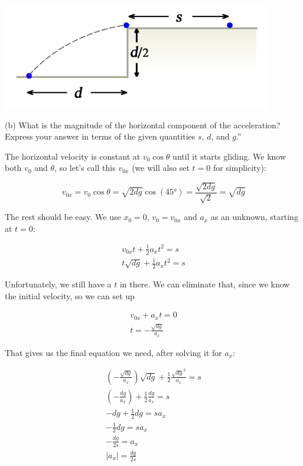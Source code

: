 \documentclass[8.01x]{subfiles}
\begin{document}
\begin{center}
\includegraphics[scale=0.6]{Graphics/h2p3_2}
\end{center}

(b) What is the magnitude of the horizontal component of the acceleration? Express your answer in terms of the given quantities $s$, $d$, and $g$.''

The horizontal velocity is constant at $v_0 \cos \theta$ until it starts gliding. We know both $v_0$ and $\theta$, so let's call this $v_{0x}$ (we will also set $t = 0$ for simplicity):

\begin{equation}
v_{0x} = v_0 \cos \theta = \sqrt{2 d g} \cos( \ang{45}) = \frac{\sqrt{2 d g}}{\sqrt{2}} = \sqrt{d g}
\end{equation}

The rest should be easy. We use $x_0 = 0$, $v_0 = v_{0x}$ and $a_x$ as an unknown, starting at $t = 0$:

\begin{align} 
v_{0x} t + \frac{1}{2} a_x t^2 = s\\
t \sqrt{d g} + \frac{1}{2} a_x t^2 = s
\end{align}

Unfortunately, we still have a $t$ in there. We can eliminate that, since we know the initial velocity, so we can set up

\begin{align}
v_{0x} + a_x t = 0\\
t = -\frac{\sqrt{d g}}{a_x}
\end{align}

That gives us the final equation we need, after solving it for $a_x$:

\begin{align}
\left(-\frac{\sqrt{d g}}{a_x}\right) \sqrt{d g} + \frac{1}{2} \frac{\sqrt{d g}^2}{a_x} = s\\
\left(-\frac{d g}{a_x}\right) + \frac{1}{2} \frac{d g}{a_x} = s\\
-d g + \frac{1}{2} d g = s a_x\\
- \frac{1}{2} d g = s a_x\\
- \frac{d g}{2s} = a_x\\
|a_x| = \frac{d g}{2s}
\end{align}
\end{document}
